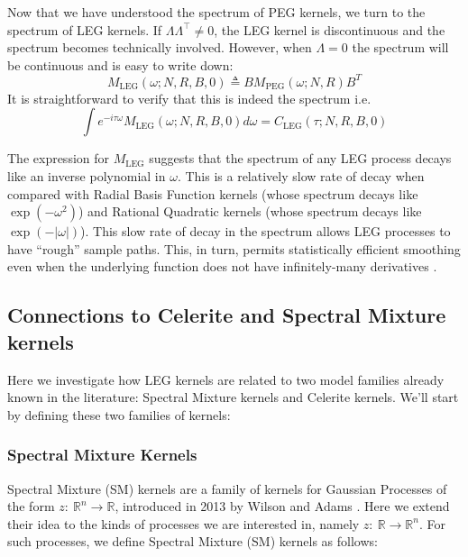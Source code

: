 \documentclass{article}
\theoremstyle{definition}
\newcommand{\LEG}{\mathrm{LEG}}
\newcommand{\PEG}{\mathrm{PEG}}
\begin{document}
Now that we have understood the spectrum of PEG kernels, we turn to the spectrum of LEG kernels.  If $\Lambda\Lambda^\top \neq0$, the LEG kernel is discontinuous and the spectrum becomes technically involved.  However, when $\Lambda=0$ the spectrum will be continuous and is easy to write down:
\[
M_\LEG(\omega;N,R,B,0) \triangleq B M_\PEG(\omega;N,R) B^T
\]
It is straightforward to verify that this is indeed the spectrum i.e.
\[
\int e^{-i\tau\omega} M_\LEG(\omega;N,R,B,0) d\omega = C_\LEG(\tau;N,R,B,0)
\]

The expression for $M_\LEG$ suggests that the spectrum of any LEG process decays like an inverse polynomial in $\omega$.  This is a relatively slow rate of decay when compared with Radial Basis Function kernels (whose spectrum decays like $\exp(-\omega^2)$) and Rational Quadratic kernels (whose spectrum decays like $\exp(-|\omega|)$).  This slow rate of decay in the spectrum allows LEG processes to have ``rough'' sample paths.  This, in turn, permits statistically efficient smoothing even when the underlying function does not have infinitely-many derivatives \cite{vaart2011information}.   

                                                       



\subsection{Connections to Celerite and Spectral Mixture kernels}

Here we investigate how LEG kernels are related to two model families already known in the literature: Spectral Mixture kernels and Celerite kernels.  We'll start by defining these two families of kernels:

\subsubsection{Spectral Mixture Kernels}

Spectral Mixture (SM) kernels are a family of kernels for Gaussian Processes of the form $z:\ \mathbb{R}^n \rightarrow \mathbb{R}$, introduced in 2013 by Wilson and Adams \cite{wilson2013gaussian}.  Here we extend their idea to the kinds of processes we are interested in, namely $z:\ \mathbb{R} \rightarrow \mathbb{R}^n$.  For such processes, we define Spectral Mixture (SM) kernels as follows:
\end{document}
